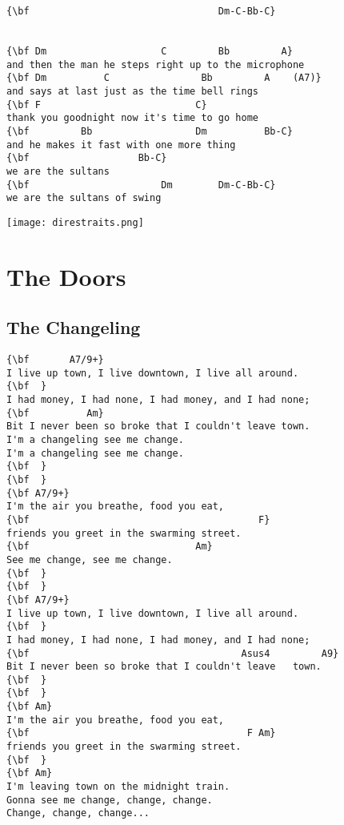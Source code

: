 \documentclass[a4paper]{article}
\begin{document}
\begin{Verbatim}[commandchars=\\\{\}]
{\bf                                 Dm-C-Bb-C}


{\bf Dm                    C         Bb         A}
and then the man he steps right up to the microphone
{\bf Dm          C                Bb         A    (A7)}
and says at last just as the time bell rings
{\bf F                           C}
thank you goodnight now it's time to go home
{\bf         Bb                  Dm          Bb-C}
and he makes it fast with one more thing
{\bf                   Bb-C}
we are the sultans
{\bf                       Dm        Dm-C-Bb-C}
we are the sultans of swing
\end{Verbatim}
\vspace{2cm}
\centerline{\texttt{[image: direstraits.png]}}
\newpage
\section{The Doors} %
\label{sec:The Doors}
\subsection{The Changeling} %
\label{sub:The Changeling}
\begin{Verbatim}[commandchars=\\\{\}]
{\bf 	   A7/9+}
I live up town, I live downtown, I live all around.
{\bf  }
I had money, I had none, I had money, and I had none;
{\bf          Am}
Bit I never been so broke that I couldn't leave town.
I'm a changeling see me change.
I'm a changeling see me change.
{\bf  }
{\bf  }
{\bf A7/9+}
I'm the air you breathe, food you eat,
{\bf                                        F}
friends you greet in the swarming street.
{\bf                             Am}
See me change, see me change.
{\bf  }
{\bf  }
{\bf A7/9+}
I live up town, I live downtown, I live all around.
{\bf  }
I had money, I had none, I had money, and I had none;
{\bf                                     Asus4         A9}
Bit I never been so broke that I couldn't leave   town.
{\bf  }
{\bf  }
{\bf Am}
I'm the air you breathe, food you eat,
{\bf                                      F Am}
friends you greet in the swarming street.
{\bf  }
{\bf Am}
I'm leaving town on the midnight train.
Gonna see me change, change, change.
Change, change, change...
\end{Verbatim}
\newpage
\end{document}
